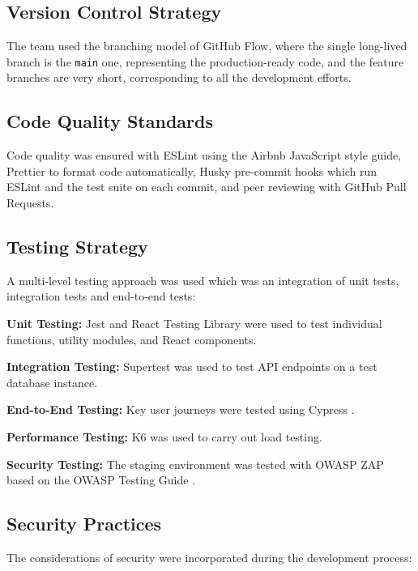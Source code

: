 \documentclass[12pt, a4paper, oneside]{report}
\begin{document}
\subsection{Version Control Strategy}

The team used the branching model of GitHub Flow, where the single long-lived branch is the \texttt{main} one, representing the production-ready code, and the feature branches are very short, corresponding to all the development efforts.

\subsection{Code Quality Standards}

Code quality was ensured with ESLint using the Airbnb JavaScript style guide, Prettier to format code automatically, Husky pre-commit hooks which run ESLint and the test suite on each commit, and peer reviewing with GitHub Pull Requests.

\subsection{Testing Strategy}

A multi-level testing approach was used which was an integration of unit tests, integration tests and end-to-end tests\cite{pressman2014}:

\textbf{Unit Testing:} Jest and React Testing Library were used to test individual functions, utility modules, and React components.

\textbf{Integration Testing:} Supertest was used to test API endpoints on a test database instance.

\textbf{End-to-End Testing:} Key user journeys were tested using Cypress \cite{cypress2024}.

\textbf{Performance Testing:} K6 was used to carry out load testing\cite{k62024}.

\textbf{Security Testing:} The staging environment was tested with OWASP ZAP based on the OWASP Testing Guide \cite{owasp2021}.

\subsection{Security Practices}

The considerations of security were incorporated during the development process\cite{owasp2021}:
\end{document}
